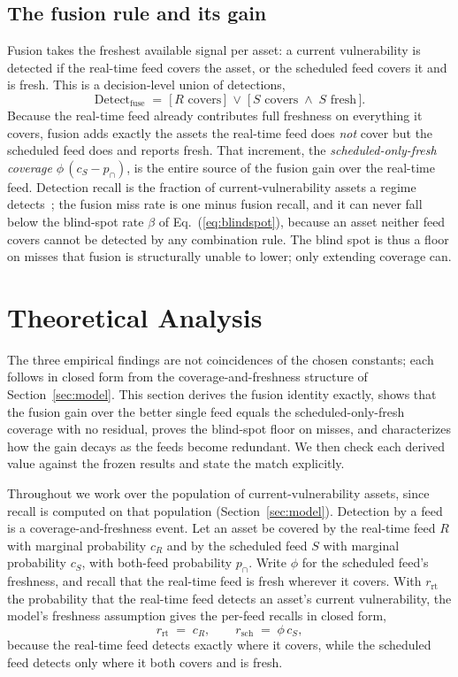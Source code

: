 \documentclass[journal]{IEEEtran}
\begin{document}
\subsection{The fusion rule and its gain}
Fusion takes the freshest available signal per asset: a current vulnerability is detected if the
real-time feed covers the asset, or the scheduled feed covers it and is fresh. This is a
decision-level union of detections,
\begin{equation}
\mathrm{Detect}_{\text{fuse}} \;=\; \big[\,R\text{ covers}\,\big] \;\vee\; \big[\,S\text{ covers} \;\wedge\; S\text{ fresh}\,\big].
\label{eq:fusion}
\end{equation}
Because the real-time feed already contributes full freshness on everything it covers, fusion adds
exactly the assets the real-time feed does \emph{not} cover but the scheduled feed does and reports
fresh. That increment, the \emph{scheduled-only-fresh coverage} $\phi\,(c_S - p_{\cap})$, is the
entire source of the fusion gain over the real-time feed. Detection recall is the fraction of
current-vulnerability assets a regime detects~\cite{davis2006pr}; the fusion miss rate is one minus
fusion recall, and it can never fall below the blind-spot rate $\beta$ of Eq.~(\ref{eq:blindspot}),
because an asset neither feed covers cannot be detected by any combination rule. The blind spot is
thus a floor on misses that fusion is structurally unable to lower; only extending coverage can.

\section{Theoretical Analysis}
\label{sec:theory}
The three empirical findings are not coincidences of the chosen constants; each follows in closed
form from the coverage-and-freshness structure of Section~\ref{sec:model}. This section derives the
fusion identity exactly, shows that the fusion gain over the better single feed equals the
scheduled-only-fresh coverage with no residual, proves the blind-spot floor on misses, and
characterizes how the gain decays as the feeds become redundant. We then check each derived value
against the frozen results and state the match explicitly.

Throughout we work over the population of current-vulnerability assets, since recall is computed on
that population (Section~\ref{sec:model}). Detection by a feed is a coverage-and-freshness event.
Let an asset be covered by the real-time feed $R$ with marginal probability $c_R$ and by the
scheduled feed $S$ with marginal probability $c_S$, with both-feed probability $p_{\cap}$. Write
$\phi$ for the scheduled feed's freshness, and recall that the real-time feed is fresh wherever it
covers. With $r_{\mathrm{rt}}$ the probability that the real-time feed detects an asset's current
vulnerability, the model's freshness assumption gives the per-feed recalls in closed form,
\begin{equation}
r_{\mathrm{rt}} \;=\; c_R, \qquad r_{\mathrm{sch}} \;=\; \phi\,c_S,
\label{eq:single_recalls}
\end{equation}
because the real-time feed detects exactly where it covers, while the scheduled feed detects only
where it both covers and is fresh.
\end{document}
